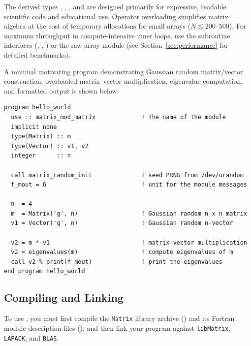 \begin{notebox}
The derived types , , , and  are designed primarily for expressive, readable scientific code and educational use. Operator overloading simplifies matrix algebra at the cost of temporary allocations for small arrays ($N \lesssim 200$--$500$). For maximum throughput in compute-intensive inner loops, use the subroutine interfaces (, , ) or the raw array module  (see Section~\ref{sec:performance} for detailed benchmarks).
\end{notebox}

A minimal motivating program demonstrating Gaussian random matrix/vector construction, overloaded matrix--vector multiplication, eigenvalue computation, and formatted output is shown below:
\lstset{language=[95]Fortran}
\begin{lstlisting}
program hello_world
  use :: matrix_mod_matrix             ! The name of the module
  implicit none
  type(Matrix) :: m
  type(Vector) :: v1, v2
  integer      :: n

  call matrix_random_init              ! seed PRNG from /dev/urandom
  f_mout = 6                           ! unit for the module messages

  n  = 4
  m  = Matrix('g', n)                  ! Gaussian random n x n matrix
  v1 = Vector('g', n)                  ! Gaussian random n-vector

  v2 = m * v1                          ! matrix-vector multiplication
  v2 = eigenvalues(m)                  ! compute eigenvalues of m
  call v2 % print(f_mout)              ! print the eigenvalues
end program hello_world
\end{lstlisting}

\subsection{Compiling and Linking}
\label{subsec:compiling}

To use , you must first compile the \texttt{Matrix} library archive () and its Fortran module description files (), and then link your program against \texttt{libMatrix}, \texttt{LAPACK}, and \texttt{BLAS}.


